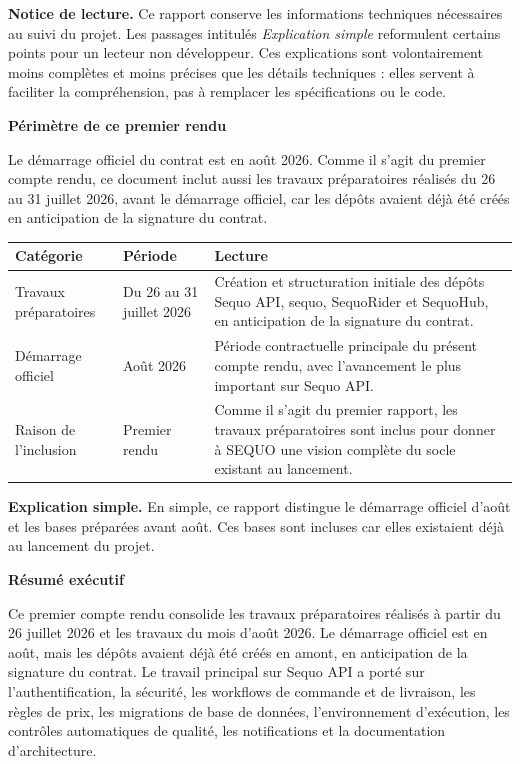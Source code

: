 \documentclass[11pt,letterpaper]{article}
\newcommand{\sectiontitle}[1]{%
  \vspace{0.55em}
  {\Large\bfseries\color{SequoInk}#1}\par
  \vspace{0.1em}
}
\newcommand{\simpleexplanation}[1]{%
  {\small\textbf{\color{SequoBlue}Explication simple.} \color{SequoMuted}#1\par}
}
\begin{document}
\begin{titlepage}
  \vspace{0.55cm}
  {\small
  \textbf{Notice de lecture.} Ce rapport conserve les informations techniques nécessaires au suivi du projet. Les passages intitulés \textit{Explication simple} reformulent certains points pour un lecteur non développeur. Ces explications sont volontairement moins complètes et moins précises que les détails techniques : elles servent à faciliter la compréhension, pas à remplacer les spécifications ou le code.
  }
\end{titlepage}

\pagestyle{fancy}

\sectiontitle{Périmètre de ce premier rendu}
Le démarrage officiel du contrat est en août 2026. Comme il s'agit du premier compte rendu, ce document inclut aussi les travaux préparatoires réalisés du 26 au 31 juillet 2026, avant le démarrage officiel, car les dépôts avaient déjà été créés en anticipation de la signature du contrat.

{\small
\begin{tabularx}{\linewidth}{@{}L{3.4cm}L{3.2cm}Y@{}}
\toprule
{}
\textbf{Catégorie} & \textbf{Période} & \textbf{Lecture} \\
\midrule
Travaux préparatoires & Du 26 au 31 juillet 2026 & Création et structuration initiale des dépôts Sequo API, sequo, SequoRider et SequoHub, en anticipation de la signature du contrat. \\
Démarrage officiel & Août 2026 & Période contractuelle principale du présent compte rendu, avec l'avancement le plus important sur Sequo API. \\
Raison de l'inclusion & Premier rendu & Comme il s'agit du premier rapport, les travaux préparatoires sont inclus pour donner à SEQUO une vision complète du socle existant au lancement. \\
\bottomrule
\end{tabularx}
}

\simpleexplanation{En simple, ce rapport distingue le démarrage officiel d'août et les bases préparées avant août. Ces bases sont incluses car elles existaient déjà au lancement du projet.}

\sectiontitle{Résumé exécutif}
Ce premier compte rendu consolide les travaux préparatoires réalisés à partir du 26 juillet 2026 et les travaux du mois d'août 2026. Le démarrage officiel est en août, mais les dépôts avaient déjà été créés en amont, en anticipation de la signature du contrat. Le travail principal sur Sequo API a porté sur l'authentification, la sécurité, les workflows de commande et de livraison, les règles de prix, les migrations de base de données, l'environnement d'exécution, les contrôles automatiques de qualité, les notifications et la documentation d'architecture.
\end{document}
